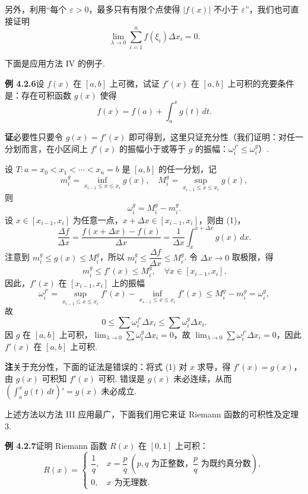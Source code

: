 \documentclass[UTF8, 12pt, fontset=fandol, oneside]{ctexart}
\begin{document}
另外，利用“每个 $\varepsilon>0$，最多只有有限个点使得 $|f(x)|$ 不小于 $\varepsilon$”，我们也可直接证明
\[
\lim_{\lambda\to0}\sum_{i=1}^n f(\xi_i)\Delta x_i=0.
\]

下面是应用方法 IV 的例子.

\noindent\textbf{例 4.2.6}\quad 设 $f(x)$ 在 $[a,b]$ 上可微，试证 $f'(x)$ 在 $[a,b]$ 上可积的充要条件是：存在可积函数 $g(x)$ 使得
\[
f(x)=f(a)+\int_a^x g(t)\,dt.
\tag{1}
\]

\noindent\textbf{证}\quad 必要性只要令 $g(x)=f'(x)$ 即可得到，这里只证充分性（我们证明：对任一分划而言，在小区间上 $f'(x)$ 的振幅小于或等于 $g$ 的振幅：$\omega_i^{f'}\le\omega_i^g$）.

设 $T:a=x_0<x_1<\cdots<x_n=b$ 是 $[a,b]$ 的任一分划，记
\[
m_i^g=\inf_{x_{i-1}\le x\le x_i}g(x),\quad
M_i^g=\sup_{x_{i-1}\le x\le x_i}g(x),
\]
则
\[
\omega_i^g=M_i^g-m_i^g.
\]
设 $x\in[x_{i-1},x_i]$ 为任意一点，$x+\Delta x\in[x_{i-1},x_i]$，则由 (1)，
\[
\frac{\Delta f}{\Delta x}
=\frac{f(x+\Delta x)-f(x)}{\Delta x}
=\frac1{\Delta x}\int_x^{x+\Delta x}g(x)\,dx.
\]
注意到 $m_i^g\le g(x)\le M_i^g$，所以 $m_i^g\le\dfrac{\Delta f}{\Delta x}\le M_i^g$. 令 $\Delta x\to0$ 取极限，得
\[
m_i^g\le f'(x)\le M_i^g,\quad \forall x\in[x_{i-1},x_i].
\]
因此，$f'(x)$ 在 $[x_{i-1},x_i]$ 上的振幅
\[
\omega_i^{f'}=
\sup_{x_{i-1}\le x\le x_i}f'(x)
-\inf_{x_{i-1}\le x\le x_i}f'(x)
\le M_i^g-m_i^g=\omega_i^g,
\]
故
\[
0\le\sum\omega_i^{f'}\Delta x_i\le\sum\omega_i^g\Delta x_i.
\]
因 $g$ 在 $[a,b]$ 上可积，$\lim_{\lambda\to0}\sum\omega_i^g\Delta x_i=0$，故 $\lim_{\lambda\to0}\sum\omega_i^{f'}\Delta x_i=0$，因此 $f'(x)$ 在 $[a,b]$ 上可积.

\noindent\textbf{注}\quad 关于充分性，下面的证法是错误的：将式 (1) 对 $x$ 求导，得 $f'(x)=g(x)$，由 $g(x)$ 可积知 $f'(x)$ 可积. 错误是 $g(x)$ 未必连续，从而 $\left(\int_a^x g(t)\,dt\right)'=g(x)$ 未必成立.

上述方法以方法 III 应用最广，下面我们用它来证 Riemann 函数的可积性及定理 3.

\noindent\textbf{例 4.2.7}\quad 证明 Riemann 函数 $R(x)$ 在 $[0,1]$ 上可积：
\[
R(x)=
\begin{cases}
\dfrac1q, & x=\dfrac pq\ (p,q\text{ 为正整数，}\dfrac pq\text{ 为既约真分数}),\\
0, & x\text{ 为无理数}.
\end{cases}
\]
\end{document}
